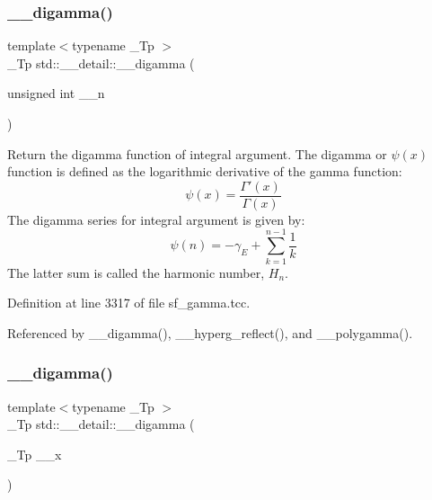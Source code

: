\mbox{\label{namespacestd_1_1____detail_a8ae60de1f8adf628c0b7f243231b98c3}} 
\subsubsection{\texorpdfstring{\+\_\+\+\_\+digamma()}{\_\_digamma()}\hspace{0.1cm}{\footnotesize\ttfamily [1/2]}}
{\footnotesize\ttfamily template$<$typename \+\_\+\+Tp $>$ \\
\+\_\+\+Tp std\+::\+\_\+\+\_\+detail\+::\+\_\+\+\_\+digamma (\begin{DoxyParamCaption}\item[{unsigned int}]{\+\_\+\+\_\+n }\end{DoxyParamCaption})}



Return the digamma function of integral argument. The digamma or $ \psi(x) $ function is defined as the logarithmic derivative of the gamma function\+: \[ \psi(x) = \frac{\Gamma'(x)}{\Gamma(x)} \] The digamma series for integral argument is given by\+: \[ \psi(n) = -\gamma_E + \sum_{k=1}^{n-1} \frac{1}{k} \] The latter sum is called the harmonic number, $ H_n $. 



Definition at line 3317 of file sf\+\_\+gamma.\+tcc.



Referenced by \+\_\+\+\_\+digamma(), \+\_\+\+\_\+hyperg\+\_\+reflect(), and \+\_\+\+\_\+polygamma().

\mbox{\label{namespacestd_1_1____detail_af83cdc6dd8c24e164b8c71491c4b0080}} 
\subsubsection{\texorpdfstring{\+\_\+\+\_\+digamma()}{\_\_digamma()}\hspace{0.1cm}{\footnotesize\ttfamily [2/2]}}
{\footnotesize\ttfamily template$<$typename \+\_\+\+Tp $>$ \\
\+\_\+\+Tp std\+::\+\_\+\+\_\+detail\+::\+\_\+\+\_\+digamma (\begin{DoxyParamCaption}\item[{\+\_\+\+Tp}]{\+\_\+\+\_\+x }\end{DoxyParamCaption})}



